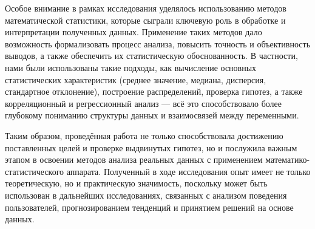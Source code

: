 \documentclass[a4paper]{article}
\begin{document}
Особое внимание в рамках исследования уделялось использованию методов математической статистики, которые сыграли ключевую роль в обработке и интерпретации полученных данных. Применение таких методов дало возможность формализовать процесс анализа, повысить точность и объективность выводов, а также обеспечить их статистическую обоснованность. В частности, нами были использованы такие подходы, как вычисление основных статистических характеристик (среднее значение, медиана, дисперсия, стандартное отклонение), построение распределений, проверка гипотез, а также корреляционный и регрессионный анализ — всё это способствовало более глубокому пониманию структуры данных и взаимосвязей между переменными.

Таким образом, проведённая работа не только способствовала достижению поставленных целей и проверке выдвинутых гипотез, но и послужила важным этапом в освоении методов анализа реальных данных с применением математико-статистического аппарата. Полученный в ходе исследования опыт имеет не только теоретическую, но и практическую значимость, поскольку может быть использован в дальнейших исследованиях, связанных с анализом поведения пользователей, прогнозированием тенденций и принятием решений на основе данных.
\end{document}
